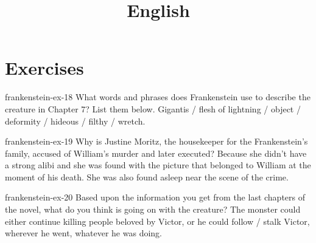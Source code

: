 \documentclass[preview]{standalone}
\begin{document}
\title{English}
\genpage

\section{Exercises}

\begin{snippetexercise}{frankenstein-ex-18}
    { What words and phrases does Frankenstein use to describe the creature in Chapter 7? List them
    below.}
    Gigantis / flesh of lightning / object / deformity / hideous / filthy / wretch.
\end{snippetexercise}

\begin{snippetexercise}{frankenstein-ex-19}
    {Why is Justine Moritz, the housekeeper for the Frankenstein's family, accused
    of William's murder and later executed?}
    Because she didn't have a strong alibi  and she was found with the picture that belonged
    to William at the moment of his death. She was also found asleep near the scene
    of the crime.
\end{snippetexercise}

\begin{snippetexercise}{frankenstein-ex-20}
    {Based upon the information you get from the last chapters of the novel, what do you think is
    going on with the creature?}
    The monster could either continue killing people beloved by Victor, or
    he could follow / stalk Victor, wherever he went, whatever he was doing.
\end{snippetexercise}
\end{document}

